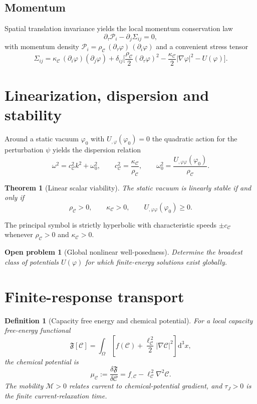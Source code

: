 \documentclass[11pt,a4paper]{article}
\newtheorem{definition}[axiom]{Definition}
\newtheorem{theorem}[axiom]{Theorem}
\newtheorem{openproblem}[axiom]{Open problem}
\newcommand{\C}{\mathcal{C}}
\renewcommand{\dd}{\mathrm{d}}
\newcommand{\rhoC}{\rho_{\mathcal{C}}}
\newcommand{\kC}{\kappa_{\mathcal{C}}}
\newcommand{\Boxed}[1]{\boxed{\displaystyle #1}}
\begin{document}
\subsection{Momentum}

Spatial translation invariance yields the local momentum conservation law
\[
\Boxed{\partial_\tau\mathcal{P}_i-\partial_j\Sigma_{ij}=0,}
\]
with momentum density \(\mathcal{P}_i=\rhoC\,(\partial_\tau\varphi)\,(\partial_i\varphi)\) and a convenient stress tensor
\begin{equation}
\Sigma_{ij}=\kC\,(\partial_i\varphi)(\partial_j\varphi)+\delta_{ij}\Biggl[\frac{\rhoC}{2}(\partial_\tau\varphi)^2-\frac{\kC}{2}|\nabla\varphi|^2-U(\varphi)\Biggr].
\end{equation}

\section{Linearization, dispersion and stability}

Around a static vacuum \(\varphi_0\) with \(U_{,\varphi}(\varphi_0)=0\) the quadratic action for the perturbation \(\psi\) yields the dispersion relation
\[
\omega^2=c_{\mathcal{C}}^2k^2+\omega_0^2,\qquad
c_{\mathcal{C}}^2=\frac{\kC}{\rhoC},\qquad
\omega_0^2=\frac{U_{,\varphi\varphi}(\varphi_0)}{\rhoC}.
\]

\begin{theorem}[Linear scalar viability]
The static vacuum is linearly stable if and only if
\[
\Boxed{\rhoC>0,\qquad\kC>0,\qquad U_{,\varphi\varphi}(\varphi_0)\ge0.}
\]
\end{theorem}

The principal symbol is strictly hyperbolic with characteristic speeds \(\pm c_{\mathcal{C}}\) whenever \(\rhoC>0\) and \(\kC>0\).

\begin{openproblem}[Global nonlinear well-posedness]
Determine the broadest class of potentials \(U(\varphi)\) for which finite-energy solutions exist globally.
\end{openproblem}

\section{Finite-response transport}

\begin{definition}[Capacity free energy and chemical potential]
For a local capacity free-energy functional
\[
\mathfrak F[\C]
=
\int_\Omega
\left[
f(\C)+\frac{\ell_{\mathcal C}^{\,2}}{2}|\nabla\C|^2
\right]\dd^3x,
\]
the chemical potential is
\[
\mu_{\mathcal C}
:=
\frac{\delta\mathfrak F}{\delta\C}
=
f_{,\C}-\ell_{\mathcal C}^{\,2}\nabla^2\C .
\]
The mobility \(\mathcal M>0\) relates current to chemical-potential gradient,
and \(\tau_J>0\) is the finite current-relaxation time.
\end{definition}
\end{document}
